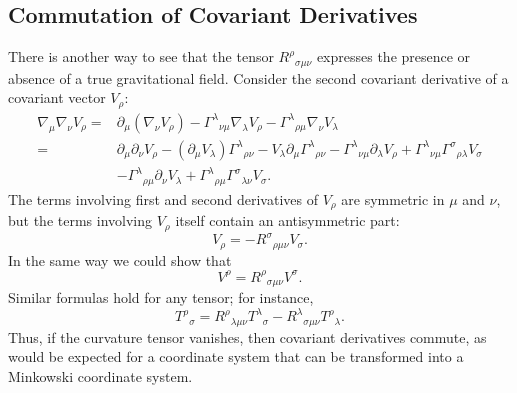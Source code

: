 
\subsection{Commutation of Covariant Derivatives}\label{sec:6.5}

There is another way to see that the tensor
\(R^\rho{}_{\sigma\mu\nu}\) expresses the presence or absence of a true
gravitational field. Consider the second covariant derivative of a covariant
vector \(V_\rho\):
\begin{align*}
  \nabla_\mu\nabla_\nu V_\rho
  ={}&
  \partial_\mu(\nabla_\nu V_\rho)
  -\Gamma^\lambda{}_{\nu\mu}\nabla_\lambda V_\rho
  -\Gamma^\lambda{}_{\rho\mu}\nabla_\nu V_\lambda
  \\
  ={}&
  \partial_\mu\partial_\nu V_\rho
  -(\partial_\mu V_\lambda)\Gamma^\lambda{}_{\rho\nu}
  -V_\lambda\partial_\mu\Gamma^\lambda{}_{\rho\nu}
  -\Gamma^\lambda{}_{\nu\mu}\partial_\lambda V_\rho
  +\Gamma^\lambda{}_{\nu\mu}\Gamma^\sigma{}_{\rho\lambda}V_\sigma
  \\
  &-\Gamma^\lambda{}_{\rho\mu}\partial_\nu V_\lambda
  +\Gamma^\lambda{}_{\rho\mu}\Gamma^\sigma{}_{\lambda\nu}V_\sigma.
\end{align*}
The terms involving first and second derivatives of \(V_\rho\) are symmetric
in \(\mu\) and \(\nu\), but the terms involving \(V_\rho\) itself contain an
antisymmetric part:
\begin{equation}
  [\nabla_\mu,\nabla_\nu]V_\rho
  =
  -R^\sigma{}_{\rho\mu\nu}V_\sigma.
  \tag{6.5.1}\label{eq:6.5.1}
\end{equation}
In the same way we could show that
\begin{equation}
  [\nabla_\mu,\nabla_\nu]V^\rho
  =
  R^\rho{}_{\sigma\mu\nu}V^\sigma.
  \tag{6.5.2}\label{eq:6.5.2}
\end{equation}
Similar formulas hold for any tensor; for instance,
\begin{equation}
  [\nabla_\mu,\nabla_\nu]T^\rho{}_\sigma
  =
  R^\rho{}_{\lambda\mu\nu}T^\lambda{}_\sigma
  -R^\lambda{}_{\sigma\mu\nu}T^\rho{}_\lambda.
  \tag{6.5.3}\label{eq:6.5.3}
\end{equation}
Thus, if the curvature tensor vanishes, then covariant derivatives commute,
as would be expected for a coordinate system that can be transformed into a
Minkowski coordinate system.
